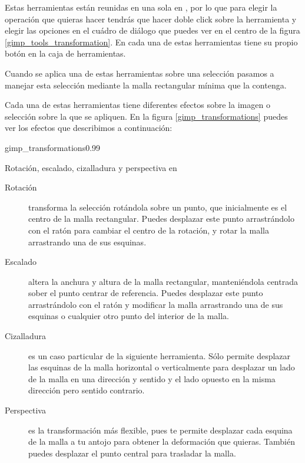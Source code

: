 Estas  herramientas están  reunidas  en  una sola  en  ,  por
lo  que  para  elegir  la  operación que  quieras  hacer  tendrás  que
hacer  doble click  sobre  la  herramienta y  elegir  las opciones  en
el  cuádro  de diálogo  que  puedes  ver en  el  centro  de la  figura
\ref{gimp_tools_transformation}.  En    cada  una  de  estas
herramientas tiene su propio botón en la caja de herramientas.

Cuando se aplica una de estas herramientas sobre una selección pasamos
a manejar esta  selección mediante la malla rectangular  mínima que la
contenga.

Cada  una  de  estas   herramientas  tiene  diferentes  efectos  sobre
la  imagen  o  selección  sobre  la que  se  apliquen.  En  la  figura
\ref{gimp_transformations} puedes  ver los  efectos que  describimos a
continuación:

\begin{figura}{gimp_transformations}{0.99}
\caption{Rotación, escalado, cizalladura y perspectiva en }
\end{figura}

\begin{description}

\item[Rotación] transforma la selección  rotándola sobre un punto, que
inicialmente es  el centro de  la malla rectangular.  Puedes desplazar
este punto  arrastrándolo con el  ratón para  cambiar el centro  de la
rotación, y rotar la malla arrastrando una de sus esquinas.

\item[Escalado] altera  la anchura y  altura de la  malla rectangular,
manteniéndola centrada  sober el  punto centrar de  referencia. Puedes
desplazar este punto  arrastrándolo con el ratón y  modificar la malla
arrastrando una de sus esquinas o cualquier otro punto del interior de
la malla.

\item[Cizalladura] es un caso  particular de la siguiente herramienta.
Sólo  permite  desplazar  las  esquinas   de  la  malla  horizontal  o
verticalmente para  desplazar un lado de  la malla en una  dirección y
sentido  y  el  lado  opuesto  en  la  misma  dirección  pero  sentido
contrario.

\item[Perspectiva] es la transformación  más flexible, pues te permite
desplazar  cada esquina  de  la  malla a  tu  antojo  para obtener  la
deformación  que quieras.  También puedes  desplazar el  punto central
para trasladar la malla.

\end{description}

